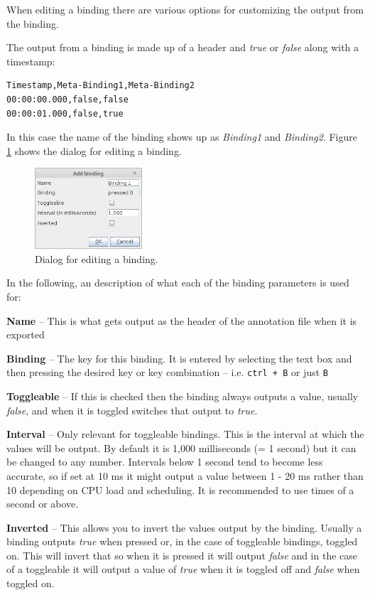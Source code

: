 \documentclass[a4paper]{book}
\begin{document}
When editing a binding there are various options for customizing the output
from the binding.

The output from a binding is made up of a header and \textit{true} or
\textit{false} along with a timestamp:

\begin{verbatim}
Timestamp,Meta-Binding1,Meta-Binding2
00:00:00.000,false,false
00:00:01.000,false,true
\end{verbatim}

In this case the name of the binding shows up as \textit{Binding1} and
\textit{Binding2}. Figure \ref{add_binding} shows the dialog for editing a
binding.

\begin{figure}[htb]
  \centering
  \includegraphics[width=4.0cm]{images/add_binding.png}
  \caption{Dialog for editing a binding.}
  \label{add_binding}
\end{figure}

In the following, an description of what each of the binding parameters is
used for:
\begin{tight_itemize}
  \item \textbf{Name} -- This is what gets output as the header of the
  annotation file when it is exported
  \item \textbf{Binding} -- The key for this binding. It is entered by
  selecting the text box and then pressing the desired key or key combination
  -- i.e. \texttt{ctrl + B} or just \texttt{B}
  \item \textbf{Toggleable} -- If this is checked then the binding always
  outputs a value, usually \textit{false}, and when it is toggled switches
  that output to \textit{true}.
  \item \textbf{Interval} -- Only relevant for toggleable bindings. This is
  the interval at which the values will be output. By default it is 1,000
  milliseconds (= 1 second) but it can be changed to any number. Intervals
  below 1 second tend to become less accurate, so if set at 10 ms it might
  output a value between 1 - 20 ms rather than 10 depending on CPU load and
  scheduling. It is recommended to use times of a second or above.
  \item \textbf{Inverted} -- This allows you to invert the values output
  by the binding. Usually a binding outputs \textit{true} when pressed or, in the
  case of toggleable bindings, toggled on. This will invert that so when
  it is pressed it will output \textit{false} and in the case of a toggleable it
  will output a value of \textit{true} when it is toggled off and \textit{false} when toggled on.
\end{tight_itemize}
\end{document}
